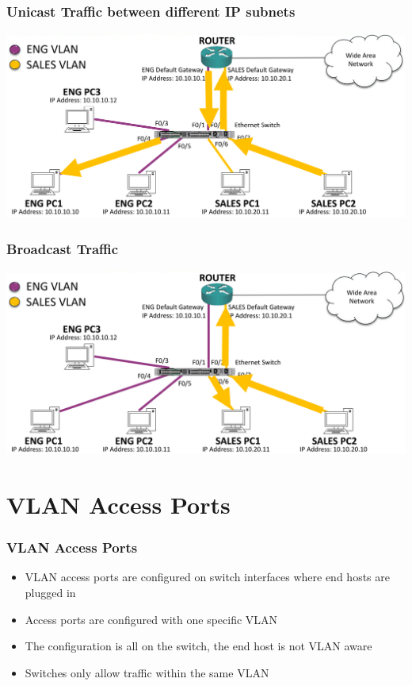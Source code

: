 \documentclass[pdflatex,compress,mathserif]{beamer}
\begin{document}
\begin{frame}
	\frametitle{Unicast Traffic between different IP subnets}
	\begin{center}
		\includegraphics[width=\linewidth]{img/img16}
	\end{center}
\end{frame}

\begin{frame}
	\frametitle{Broadcast Traffic}
	\begin{center}
		\includegraphics[width=\linewidth]{img/img17}
	\end{center}
\end{frame}

\section{VLAN Access Ports}

\begin{frame}
	\frametitle{VLAN Access Ports}
	\begin{itemize}
		\item VLAN access ports are configured on switch interfaces where end hosts
are plugged in
		\item Access ports are configured with one specific VLAN
		\item The configuration is all on the switch, the end host is not VLAN aware
		\item Switches only allow traffic within the same VLAN
	\end{itemize}
\end{frame}
\end{document}
